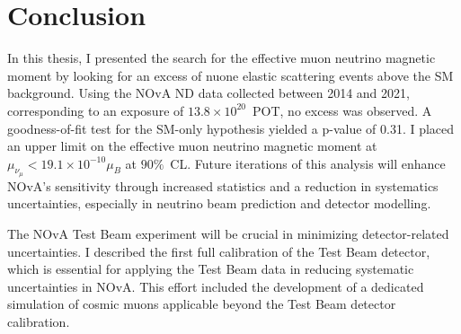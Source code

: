 \chapter{Conclusion}\label{sec:Conclusion}

In this thesis, I presented the search for the effective muon neutrino magnetic moment by looking for an excess of \gls{nuone} elastic scattering events above the \gls{SM} background. Using the \gls{NOvA} \gls{ND} data collected between 2014 and 2021, corresponding to an exposure of $13.8\times10^{20}$~\gls{POT}, no excess was observed. A goodness-of-fit test for the \gls{SM}-only hypothesis yielded a p-value of 0.31. I placed an upper limit on the effective muon neutrino magnetic moment at $\mu_{\nu_\mu}<19.1\times 10^{-10}\mu_B$ at $90\%$~\gls{CL}. Future iterations of this analysis will enhance \gls{NOvA}'s sensitivity through increased statistics and a reduction in systematics uncertainties, especially in neutrino beam prediction and detector modelling.

The NOvA Test Beam experiment will be crucial in minimizing detector-related uncertainties. I described the first full calibration of the Test Beam detector, which is essential for applying the Test Beam data in reducing systematic uncertainties in \gls{NOvA}. This effort included the development of a dedicated simulation of cosmic muons applicable beyond the Test Beam detector calibration.